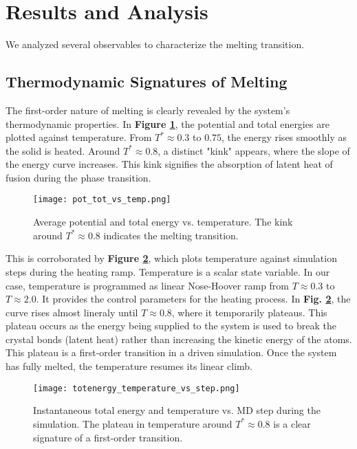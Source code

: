 \documentclass{article}
\begin{document}
\section{Results and Analysis}

We analyzed several observables to characterize the melting transition.

\subsection{Thermodynamic Signatures of Melting}

The first-order nature of melting is clearly revealed by the system's thermodynamic properties. In \textbf{Figure \ref{fig:pot_tot_vs_temp}}, the potential and total energies are plotted against temperature. From $T^* \approx 0.3$ to $0.75$, the energy rises smoothly as the solid is heated. Around $T^* \approx 0.8$, a distinct "kink" appears, where the slope of the energy curve increases. This kink signifies the absorption of latent heat of fusion during the phase transition.

\begin{figure}[h!]
    \centering
    \texttt{[image: pot\_tot\_vs\_temp.png]}
    \caption{Average potential and total energy vs. temperature. The kink around $T^* \approx 0.8$ indicates the melting transition.}
    \label{fig:pot_tot_vs_temp}
\end{figure}

This is corroborated by \textbf{Figure \ref{fig:tot_temp_vs_step}}, which plots temperature against simulation steps during the heating ramp.
Temperature is a scalar state variable. In our case, temperature is programmed as linear Nose-Hoover ramp from $T\approx0.3$ to $T\approx2.0$. It provides the control parameters for the heating process. 
In \textbf{Fig. \ref{fig:tot_temp_vs_step}}, the curve rises almost lineraly until $T\approx0.8$, where it temporarily plateaus. This plateau occurs as the energy being supplied to the system is used to break the crystal bonds (latent heat) rather than increasing the kinetic energy of the atoms. This plateau is a first-order transition in a driven simulation. Once the system has fully melted, the temperature resumes its linear climb.

\begin{figure}[h!]
    \centering
    \texttt{[image: totenergy\_temperature\_vs\_step.png]}
    \caption{Instantaneous total energy and temperature vs. MD step during the simulation. The plateau in temperature around $T^* \approx 0.8$ is a clear signature of a first-order transition.}
    \label{fig:tot_temp_vs_step}
\end{figure}
\end{document}
